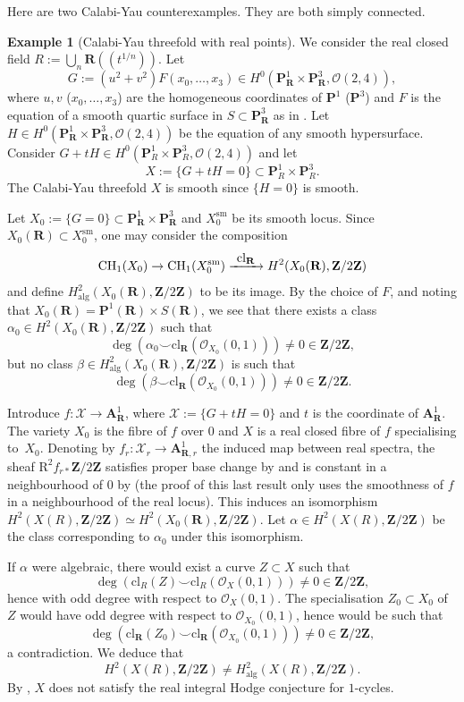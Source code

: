 \documentclass[JEP,XML,SOM,Unicode]{cedram}
\newcommand{\To}[1]{\mathchoice{\xrightarrow{\textstyle\kern4pt#1\kern3pt}}{\stackrel{#1}{\longrightarrow}}{}{}}
\newcommand{\lpr}{(\!(}
\newcommand{\rpr}{)\!)}
\theoremstyle{plain}
\theoremstyle{definition}
\newtheorem{example}[thm]{Example}
\numberwithin{equation}{section}
\newcommand{\alg}{{\mathrm{alg}}}
\newcommand{\cl}{{\mathrm{cl}}}
\newcommand{\sO}{{\mathscr O}}
\newcommand{\sX}{{\mathscr X}}
\newcommand{\A}{{\mathbf A}}
\renewcommand{\P}{{\mathbf P}}
\newcommand{\R}{{\mathbf R}}
\newcommand{\Z}{{\mathbf Z}}
\newcommand{\CH}{\mathrm{CH}}
\newcommand{\sm}{\mathrm{sm}}
\newcommand{\RR}{{\mathrm{R}}}
\begin{document}
Here are two Calabi-Yau counterexamples. They are both simply connected.

\begin{example}[Calabi-Yau threefold with real points]
\label{ex:cexCYavecpoint}
We consider the real closed field $R:=\bigcup_n\R\lpr t^{1/n}\rpr$.
Let
\[
G:= (u^2+v^2)F(x_0,\dots,x_3)\in H^0(\P^1_\R\times\P^3_\R,\sO(2,4)),
\]
where $u,v$ (\resp $x_0,\dots,x_3$) are the homogeneous coordinates of $\P^1$ (\resp $\P^3$) and $F$ is the equation of a smooth quartic surface in $S\subset\P^3_{\R}$ as in \cite[Ex.\,\ref*{BW1-ex:quartique avec points}]{BW1}. Let $H\in H^0(\P^1_\R\times\P^3_\R,\sO(2,4))$ be the equation of any smooth hypersurface. Consider $G+tH\in H^0(\P^1_R\times\P^3_R,\sO(2,4))$ and let
\[
X:=\{G+tH=0\}\subset \P^1_R\times\P^3_R.
\]
The Calabi-Yau threefold $X$ is smooth since $\{H=0\}$ is smooth.

Let $X_0:=\{G=0\}\subset\P^1_\R\times\P^3_\R$ and $X_0^{\sm}$ be its smooth locus. Since $X_0(\R)\subset X_0^{\sm}$, one may consider
the composition
\[
\CH_1(X_0)\to \CH_1(X_0^{\sm})\To{\cl_{\R}} H^2(X_0(\R),\Z/2\Z)
\]
and define $H^2_{\alg}(X_0(\R),\Z/2\Z)$ to be its image. By the choice of $F$, and noting that $X_0(\R)=\P^1(\R)\times S(\R)$, we see that there exists a class $\alpha_0\in H^2(X_0(\R),\Z/2\Z)$ such that
\[
\deg(\alpha_0\smile\cl_{\R}(\sO_{X_0}(0,1)))\neq 0\in \Z/2\Z,
\]
but no class $\beta\in H^2_{\alg}(X_0(\R),\Z/2\Z)$ is such that
\[
\deg(\beta\smile\cl_{\R}(\sO_{X_0}(0,1)))\neq 0\in \Z/2\Z.
\]

Introduce $f:\sX\to \A^1_\R$, where $\sX:=\{G+tH=0\}$ and $t$ is the coordinate of $\A^1_\R$. The variety $X_0$ is the fibre of $f$ over $0$ and $X$ is a real closed fibre of $f$ specialising to~$X_0$. Denoting by $f_r:\sX_r\to\A^1_{\R,r}$ the induced map between real spectra, the sheaf $\RR^2f_{r*}\Z/2\Z$ satisfies proper base change by
\cite[Ch.\,II, Th.\,7.8]{delfshomology} and is constant in a neighbourhood of $0$ by \cite[Cor.\,17.20 a)]{scheiderer}
(the proof of this last result only uses the smoothness of $f$ in a neighbourhood of the real locus). This induces an isomorphism $H^2(X(R),\Z/2\Z)\simeq H^2(X_0(\R),\Z/2\Z)$.
Let $\alpha\in H^2(X(R),\Z/2\Z)$ be the class corresponding to $\alpha_0$ under this isomorphism.

If $\alpha$ were algebraic, there would exist a curve $Z\subset X$ such that
\[
\deg(\cl_{R}(Z)\smile\cl_{R}(\sO_{X}(0,1)))\neq 0\in \Z/2\Z,
\]
hence with odd degree with respect to $\sO_{X}(0,1)$. The specialisation $Z_0\subset X_0$ of~$Z$ would have odd degree with respect to $\sO_{X_0}(0,1)$, hence would be such that
\[
\deg(\cl_{\R}(Z_0)\smile\cl_{\R}(\sO_{X_0}(0,1)))\neq 0\in \Z/2\Z,
\]
a contradiction. We deduce that
\[
H^2(X(R),\Z/2\Z)\neq H^2_{\alg}(X(R),\Z/2\Z).
\]
By \cite[Cor.\,\ref*{BW1-cor:IHC pour solides RC ou CY}]{BW1}, $X$ does not satisfy the real integral Hodge conjecture for $1$\nobreakdash-cycles.


\end{example}
\end{document}
